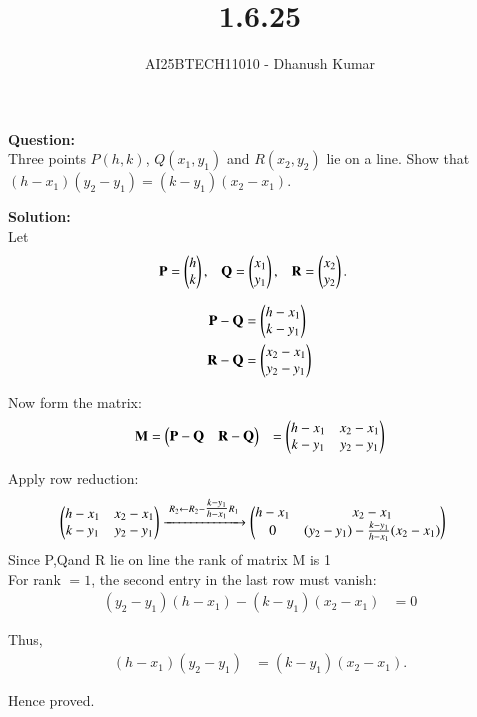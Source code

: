 \documentclass[journal]{IEEEtran}
\begin{document}
\title{1.6.25}
\author{AI25BTECH11010 - Dhanush Kumar}
\maketitle
\renewcommand{\thefigure}{\theenumi}
\renewcommand{\thetable}{\theenumi}

\noindent
\textbf{Question:} \\
Three points \(P(h, k)\), \(Q(x_1, y_1)\) and \(R(x_2, y_2)\) lie on a line. Show that 
\((h-x_1)(y_2-y_1) = (k-y_1)(x_2-x_1)\).

\bigskip
\textbf{Solution:} \\
Let
\begin{align}
\mathbf{P} &= \begin{pmatrix}h \\ k\end{pmatrix}, &
\mathbf{Q} &= \begin{pmatrix}x_1 \\ y_1\end{pmatrix}, &
\mathbf{R} &= \begin{pmatrix}x_2 \\ y_2\end{pmatrix}.
\end{align}

\begin{align}
\mathbf{P}-\mathbf{Q} &= \begin{pmatrix}h-x_1 \\ k-y_1\end{pmatrix} \\
\mathbf{R}-\mathbf{Q} &= \begin{pmatrix}x_2-x_1 \\ y_2-y_1\end{pmatrix}
\end{align}

Now form the matrix:
\begin{align}
	\mathbf{M} &=\begin{pmatrix}\mathbf{P}-\mathbf{Q} & \mathbf{R}-\mathbf{Q}\end{pmatrix} &=\begin{pmatrix}h-x_1 & x_2-x_1 \\ k-y_1 & y_2-y_1\end{pmatrix}
\end{align}

Apply row reduction:
\begin{align}
\begin{pmatrix}h-x_1 & x_2-x_1 \\ k-y_1 & y_2-y_1\end{pmatrix}
&\xrightarrow{\;R_2 \leftarrow R_2 - \tfrac{k-y_1}{h-x_1}R_1\;}
\begin{pmatrix}h-x_1 & x_2-x_1 \\ 0 & (y_2-y_1) - \tfrac{k-y_1}{h-x_1}(x_2-x_1)\end{pmatrix}
\end{align}
Since P,Qand R lie on line the rank of matrix M is 1\\
For rank \(=1\), the second entry in the last row must vanish:
\begin{align}
(y_2-y_1)(h-x_1) - (k-y_1)(x_2-x_1) &= 0
\end{align}

Thus,
\begin{align}
(h-x_1)(y_2-y_1) &= (k-y_1)(x_2-x_1).
\end{align}

Hence proved.
\end{document}
